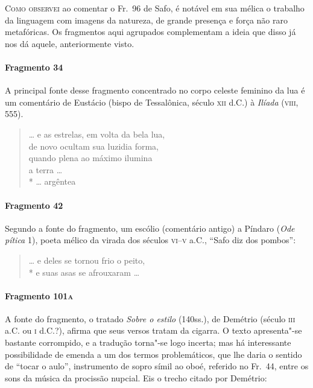 \textsc{Como observei} ao comentar o Fr.~96 de Safo, é notável em sua mélica o trabalho
da linguagem com imagens da natureza, de grande presença e força não raro
metafóricas. Os fragmentos aqui agrupados complementam a ideia que disso já nos
dá aquele, anteriormente visto.

\paragraph{Fragmento 34}

{\small A principal fonte desse fragmento concentrado no corpo celeste feminino da lua é
um comentário de Eustácio (bispo de Tessalônica, século \textsc{xii} d.C.) à
\textit{Ilíada }(\textsc{viii}, 555).}

\begin{verse}
\ldots{} e as estrelas, em volta da bela lua,\\
de novo ocultam sua luzidia forma,\\
quando plena ao máximo ilumina\\
a terra \ldots{} \\*
\ldots{} argêntea
\end{verse}

\paragraph{Fragmento 42}

{\small Segundo a fonte do fragmento, um escólio (comentário antigo) a Píndaro
(\textit{Ode pítica} 1), poeta mélico da virada dos séculos \textsc{vi}--\textsc{v} a.C.,
``Safo diz dos pombos”:}

\begin{verse}
\ldots{} e deles se tornou frio o peito,\\*
e suas asas se afrouxaram \ldots{}
\end{verse}

\paragraph{Fragmento 101\textsc{a}}

{\small A fonte do fragmento, o tratado \textit{Sobre o estilo} (140ss.), de Demétrio (século \textsc{iii}
a.C. ou \textsc{i} d.C.?), afirma que seus versos tratam da cigarra. O texto apresenta"-se bastante corrompido, e a tradução torna"-se logo incerta; mas há interessante possibilidade de emenda a um dos termos problemáticos, que lhe daria o sentido de ``tocar o aulo'', instrumento de sopro símil ao oboé, referido no Fr.~44, entre os sons da música da procissão nupcial. Eis o trecho citado por Demétrio:}









